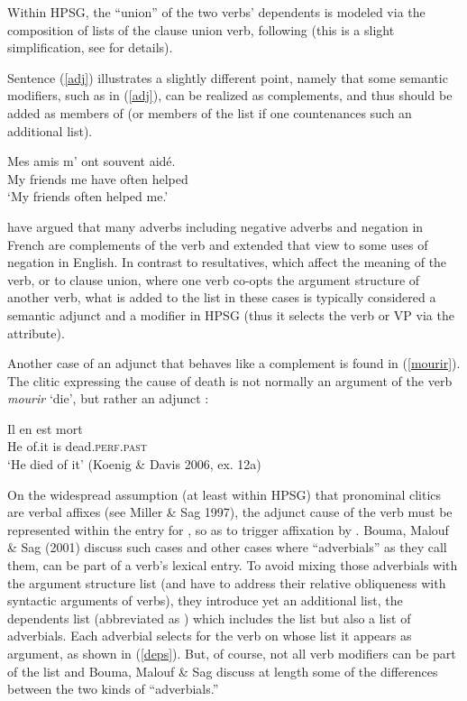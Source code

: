 \documentclass[output=paper]{langsci/langscibook}
\begin{document}
\noindent
Within HPSG, the ``union'' of the two verbs' dependents is modeled via the composition of \argst lists of the clause union verb, following \citet{HinrichsandNakazawa1994} (this is a slight simplification, see  for details). 

Sentence (\ref{adj}) illustrates a slightly different point, namely that some semantic modifiers, such as  in (\ref{adj}), can be realized as complements, and thus should be added as members of \argst (or members of the \deps list if one countenances such an additional list). 

\begin{exe}
\ex\label{adj}
 \gll
	Mes amis m’ ont souvent aidé. \\
	My friends me have often helped \\
	\glt `My friends often helped me.'
\end{exe}

\noindent
\citet{AbeilleandGodard1997} have argued that many adverbs including negative adverbs and negation in French are complements of the verb and \citet{KimandSag2002} extended that view to some uses of negation in English. In contrast to resultatives, which affect the meaning of the verb, or to clause union, where one verb co-opts the argument structure of another verb, what is added to the \argst list in these cases is typically considered a semantic adjunct and a modifier in HPSG (thus it selects the verb or VP via the  attribute). 

Another case of an adjunct that behaves like a complement is found in (\ref{mourir}).  The clitic  expressing the cause of death   is not normally an argument of the verb \textit{mourir} `die', but rather an adjunct \citep{KoenigandDavis2006}: %

\begin{exe}
	\ex\label{mourir}
	\gll Il en est mort \\
	 He of.it is dead.\textsc{perf.past} \\
	 \glt `He died of it' (Koenig \& Davis 2006, ex. 12a)
\end{exe}

\noindent
On the widespread assumption (at least within HPSG) that pronominal clitics are verbal affixes (see Miller \& Sag 1997), the adjunct cause of the verb  must be represented within the entry for , so as to trigger affixation by .  Bouma, Malouf \& Sag (2001) discuss such cases and other cases where ``adverbials'' as they call them, can be part of a verb's lexical entry. To avoid mixing those adverbials with the argument structure list (and have to address their relative obliqueness with syntactic arguments of verbs), they introduce yet an additional list, the dependents list (abbreviated as \deps) which includes the \argst list but also a list of adverbials. Each adverbial selects for the verb on whose \deps list it appears as argument, as shown in (\ref{deps}). But, of course, not all verb modifiers can be part of the \deps list and Bouma, Malouf \& Sag discuss at length some of the differences between the two kinds of ``adverbials.''
\end{document}

